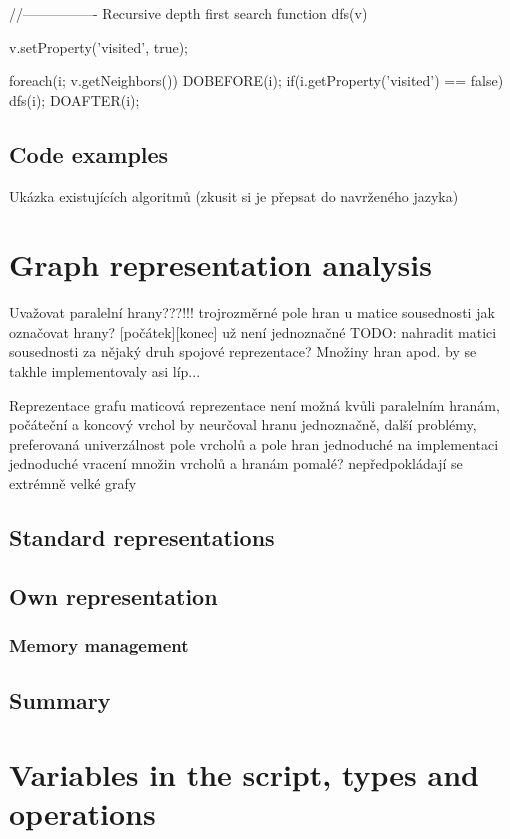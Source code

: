 \documentclass[11pt,twoside,a4paper]{book}
\begin{document}
//---------------- Recursive depth first search
function dfs(v)
{
	v.setProperty('visited', true);

	foreach(i; v.getNeighbors())
	{
		DOBEFORE(i);
		if(i.getProperty('visited') == false)
			dfs(i);
		DOAFTER(i);
	}
}

\subsection{Code examples}

Ukázka existujících algoritmů (zkusit si je přepsat do navrženého jazyka)

\section{Graph representation analysis}

Uvažovat paralelní hrany???!!!
	trojrozměrné pole hran u matice sousednosti
	jak označovat hrany? [počátek][konec] už není jednoznačné
	TODO: nahradit matici sousednosti za nějaký druh spojové reprezentace? Množiny hran apod. by se takhle implementovaly asi líp...

Reprezentace grafu
	maticová reprezentace není možná kvůli paralelním hranám, počáteční a koncový vrchol by neurčoval hranu jednoznačně, další problémy, preferovaná univerzálnost
	pole vrcholů a pole hran
	jednoduché na implementaci
	jednoduché vracení množin vrcholů a hranám
	pomalé? nepředpokládají se extrémně velké grafy

\subsection{Standard representations}

\subsection{Own representation}

\subsubsection{Memory management}

\subsection{Summary}


\section{Variables in the script, types and operations}
\end{document}
